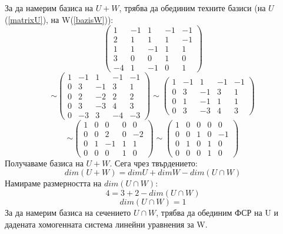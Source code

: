 \documentclass{article}
\begin{document}
За да намерим базиса на $U+W$, трябва да обединим техните базиси (на $U$(\ref*{matrixU}), на W(\ref*{bazisW})):
\[
    \left( \begin{array}{ccccc}
            1  & -1 & 1  & -1 & -1 \\
            2  & 1  & 1  & 1  & -1 \\
            1  & 1  & -1 & 1  & 1  \\
            3  & 0  & 0  & 1  & 0  \\
            -4 & 1  & -1 & 0  & 1
        \end{array}
    \right)
\]
\[
    \sim\left( \begin{array}{ccccc}
            1 & -1 & 1  & -1 & -1 \\
            0 & 3  & -1 & 3  & 1  \\
            0 & 2  & -2 & 2  & 2  \\
            0 & 3  & -3 & 4  & 3  \\
            0 & -3 & 3  & -4 & -3
        \end{array}
    \right)
    \sim\left( \begin{array}{ccccc}
            1 & -1 & 1  & -1 & -1 \\
            0 & 3  & -1 & 3  & 1  \\
            0 & 1  & -1 & 1  & 1  \\
            0 & 3  & -3 & 4  & 3
        \end{array}
    \right)
\]
\[
    \sim\left( \begin{array}{ccccc}
            1 & 0 & 0  & 0 & 0  \\
            0 & 0 & 2  & 0 & -2 \\
            0 & 1 & -1 & 1 & 1  \\
            0 & 0 & 0  & 1 & 0
        \end{array}
    \right)
    \sim\left( \begin{array}{ccccc}
            1 & 0 & 0 & 0 & 0  \\
            0 & 0 & 1 & 0 & -1 \\
            0 & 1 & 0 & 1 & 0  \\
            0 & 0 & 0 & 1 & 0
        \end{array}
    \right)
\]
Получаваме базиса на $U+W$. Сега чрез твърдението:
\[
    dim(U+W)=dimU+dimW-dim(U \cap W)
\]
Намираме размерността на $dim(U \cap W)$:
\[
    4=3+2-dim(U \cap W)
\]
\[
    dim(U \cap W)=1
\]
За да намерим базиса на сечението $U \cap W$,
трябва да обединим ФСР на U и
дадената хомогенната система линейни уравнения за W.
\end{document}
